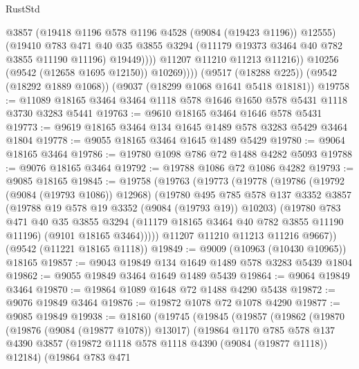 \begin{lexlean}{RustStd}
\begin{coremodule}
                      @3857
                      (@19418 @1196 @578 @1196 @4528 (@9084 (@19423 @1196)) @12555)
                      (@19410
                        @783
                        @471
                        @40
                        @35
                        @3855
                        @3294
                        (@11179 @19373 @3464 @40 @782 @3855 @11190 @11196)
                        @19449))))
                @11207
                @11210
                @11213
                @11216))
            @10256
            (@9542 (@12658 @1695 @12150))
            @10269))))
    (@9517 (@18288 @225))
    (@9542 (@18292 @1889 @1068))
    (@9037 (@18299 @1068 @1641 @5418 @18181))
@19758 := @11089 @18165 @3464 @3464 @1118 @578 @1646 @1650 @578 @5431 @1118 @3730 @3283 @5441
@19763 := @9610 @18165 @3464 @1646 @578 @5431
@19773 := @9619 @18165 @3464 @134 @1645 @1489 @578 @3283 @5429 @3464 @1804
@19778 := @9055 @18165 @3464 @1645 @1489 @5429
@19780 := @9064 @18165 @3464
@19786 := @19780 @1098 @786 @72 @1488 @4282 @5093
@19788 := @9076 @18165 @3464
@19792 := @19788 @1086 @72 @1086 @4282
@19793 := @9085 @18165
@19845 := @19758
    (@19763
      (@19773
        (@19778
          (@19786
            (@19792 (@9084 (@19793 @1086)) @12968)
            (@19780
              @495
              @785
              @578
              @137
              @3352
              @3857
              (@19788 @19 @578 @19 @3352 (@9084 (@19793 @19)) @10203)
              (@19780
                @783
                @471
                @40
                @35
                @3855
                @3294
                (@11179 @18165 @3464 @40 @782 @3855 @11190 @11196)
                (@9101 @18165 @3464)))))
        @11207
        @11210
        @11213
        @11216
        @9667))
    (@9542 (@11221 @18165 @1118))
@19849 := @9009 (@10963 (@10430 @10965)) @18165
@19857 := @9043 @19849 @134 @1649 @1489 @578 @3283 @5439 @1804
@19862 := @9055 @19849 @3464 @1649 @1489 @5439
@19864 := @9064 @19849 @3464
@19870 := @19864 @1089 @1648 @72 @1488 @4290 @5438
@19872 := @9076 @19849 @3464
@19876 := @19872 @1078 @72 @1078 @4290
@19877 := @9085 @19849
@19938 := @18160
    (@19745
      (@19845
        (@19857
          (@19862
            (@19870
              (@19876 (@9084 (@19877 @1078)) @13017)
              (@19864
                @1170
                @785
                @578
                @137
                @4390
                @3857
                (@19872 @1118 @578 @1118 @4390 (@9084 (@19877 @1118)) @12184)
                (@19864
                  @783
                  @471

\end{coremodule}
\end{lexlean}
